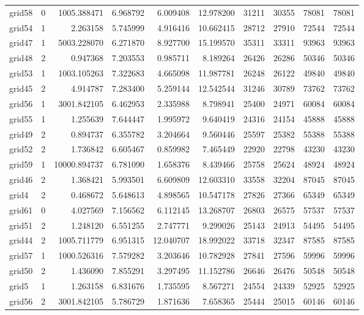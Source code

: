 \begin{longtable}{|l|r|r|r|r|r|r|r|r|r|}
grid58 & 0 & 1005.388471 & 6.968792 & 6.009408 & 12.978200 & 31211 & 30355 & 78081 & 78081 \\
grid54 & 1 & 2.263158 & 5.745999 & 4.916416 & 10.662415 & 28712 & 27910 & 72544 & 72544 \\
grid47 & 1 & 5003.228070 & 6.271870 & 8.927700 & 15.199570 & 35311 & 33311 & 93963 & 93963 \\
grid48 & 2 & 0.947368 & 7.203553 & 0.985711 & 8.189264 & 26426 & 26286 & 50346 & 50346 \\
grid53 & 1 & 1003.105263 & 7.322683 & 4.665098 & 11.987781 & 26248 & 26122 & 49840 & 49840 \\
grid45 & 2 & 4.914787 & 7.283400 & 5.259144 & 12.542544 & 31246 & 30789 & 73762 & 73762 \\
grid56 & 1 & 3001.842105 & 6.462953 & 2.335988 & 8.798941 & 25400 & 24971 & 60084 & 60084 \\
grid55 & 1 & 1.255639 & 7.644447 & 1.995972 & 9.640419 & 24316 & 24154 & 45888 & 45888 \\
grid49 & 2 & 0.894737 & 6.355782 & 3.204664 & 9.560446 & 25597 & 25382 & 55388 & 55388 \\
grid52 & 2 & 1.736842 & 6.605467 & 0.859982 & 7.465449 & 22920 & 22798 & 43230 & 43230 \\
grid59 & 1 & 10000.894737 & 6.781090 & 1.658376 & 8.439466 & 25758 & 25624 & 48924 & 48924 \\
grid46 & 2 & 1.368421 & 5.993501 & 6.609809 & 12.603310 & 33558 & 32204 & 87045 & 87045 \\
grid4 & 2 & 0.468672 & 5.648613 & 4.898565 & 10.547178 & 27826 & 27366 & 65349 & 65349 \\
grid61 & 0 & 4.027569 & 7.156562 & 6.112145 & 13.268707 & 26803 & 26575 & 57537 & 57537 \\
grid51 & 2 & 1.248120 & 6.551255 & 2.747771 & 9.299026 & 25143 & 24913 & 54495 & 54495 \\
grid44 & 2 & 1005.711779 & 6.951315 & 12.040707 & 18.992022 & 33718 & 32347 & 87585 & 87585 \\
grid57 & 1 & 1000.526316 & 7.579282 & 3.203646 & 10.782928 & 27841 & 27596 & 59996 & 59996 \\
grid50 & 2 & 1.436090 & 7.855291 & 3.297495 & 11.152786 & 26646 & 26476 & 50548 & 50548 \\
grid5 & 1 & 1.263158 & 6.831676 & 1.735595 & 8.567271 & 24554 & 24339 & 52925 & 52925 \\
grid56 & 2 & 3001.842105 & 5.786729 & 1.871636 & 7.658365 & 25444 & 25015 & 60146 & 60146 \\

\end{longtable}
